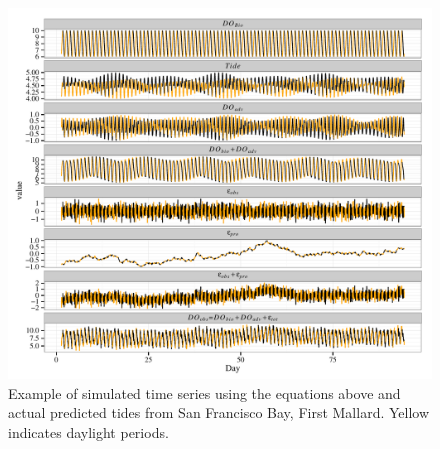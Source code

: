 \documentclass{article}\usepackage{graphicx, color}
\makeatletter
\def\maxwidth{ %
  \ifdim\Gin@nat@width>\linewidth
    \linewidth
  \else
    \Gin@nat@width
  \fi
}
\newenvironment{knitrout}{}{} %
\makeatother
\begin{document}
\begin{knitrout}
\color{fgcolor}\begin{figure}[!h]


{\centering \includegraphics[width=\maxwidth]{figure/do_sim_act} 

}

\caption[Example of simulated time series using the equations above and actual predicted tides from San Francisco Bay, First Mallard]{Example of simulated time series using the equations above and actual predicted tides from San Francisco Bay, First Mallard.  Yellow indicates daylight periods.\label{fig:do_sim_act}}
\end{figure}


\end{knitrout}



\clearpage

\vfill
\end{document}
